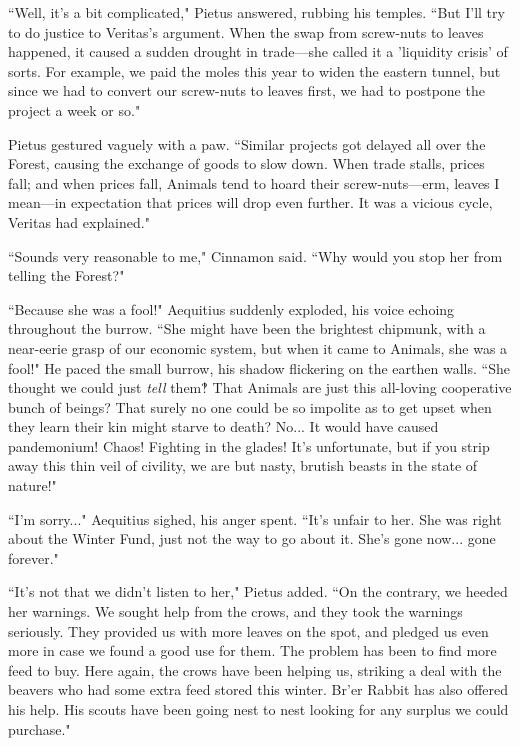 ``Well, it's a bit complicated," Pietus answered, rubbing his temples.
``But I'll try to do justice to Veritas's argument.
When the swap from screw-nuts to leaves happened, it caused a sudden drought in trade---she called it a 'liquidity crisis' of sorts. %
For example, we paid the moles this year to widen the eastern tunnel, but since we had to convert our screw-nuts to leaves first, we had to postpone the project a week or so."

Pietus gestured vaguely with a paw.
``Similar projects got delayed all over the Forest, causing the exchange of goods to slow down.
When trade stalls, prices fall; and when prices fall, Animals tend to hoard their screw-nuts---erm, leaves I mean---in expectation that prices will drop even further.
It was a vicious cycle, Veritas had explained."

``Sounds very reasonable to me," Cinnamon said.
``Why would you stop her from telling the Forest?"

``Because she was a fool!" Aequitius suddenly exploded, his voice echoing throughout the burrow.
``She might have been the brightest chipmunk, with a near-eerie grasp of our economic system, but when it came to Animals, she was a fool!"
He paced the small burrow, his shadow flickering on the earthen walls.
``She thought we could just \textit{tell} them‽ That Animals are just this all-loving cooperative bunch of beings?
That surely no one could be so impolite as to get upset when they learn their kin might starve to death?
No... It would have caused pandemonium!
Chaos!
Fighting in the glades!
It's unfortunate, but if you strip away this thin veil of civility, we are but nasty, brutish beasts in the state of nature!"

``I'm sorry..." Aequitius sighed, his anger spent.
``It's unfair to her.
She was right about the Winter Fund, just not the way to go about it.
She's gone now... gone forever."

``It's not that we didn't listen to her," Pietus added.
``On the contrary, we heeded her warnings.
We sought help from the crows, and they took the warnings seriously.
They provided us with more leaves on the spot, and pledged us even more in case we found a good use for them.
The problem has been to find more feed to buy.
Here again, the crows have been helping us, striking a deal with the beavers who had some extra feed stored this winter.
Br'er Rabbit has also offered his help.
His scouts have been going nest to nest looking for any surplus we could purchase."


